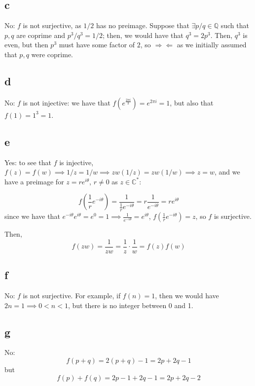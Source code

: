 \documentclass[12pt,letterpaper]{article}
\theoremstyle{definition}
\newcommand{\contra}{\Rightarrow\!\Leftarrow}
\newcommand{\Q}{\mathbb{Q}}
\newcommand{\C}{\mathbb{C}}
\begin{document}
\subsection*{c}

No: \(f\) is not surjective, as \(1/2\) has no preimage. Suppose that \(\exists p/q \in \Q\) such that \(p,q\) are coprime and \(p^{3}/q^{3} = 1 / 2\); then, we would have that \(q^{3} = 2p^{3}\). Then, \(q^{3}\) is even, but then \(p^{3}\) must have some factor of \(2\), so \(\contra\) as we initially assumed that \(p,q\) were coprime.

\subsection*{d}

No: \(f\) is not injective: we have that \(f(e^{\frac{2\pi i}{3}}) = e^{2\pi i} = 1\), but also that \(f(1) = 1^{3} = 1\).

\subsection*{e}

Yes: to see that \(f\) is injective, \(f(z) = f(w) \implies 1/z = 1/w \implies zw(1/z) = zw(1/w) \implies z = w\), and we have a preimage for \(z = re^{i\theta}\), \(r \neq 0\) as \(z \in \C^{*}\):

\[
  f\left(\frac{1}{r}e^{-i\theta}\right) = \frac{1}{\frac{1}{r}e^{-i\theta}} = r\frac{1}{e^{-i\theta}} = re^{i\theta}
\]
since we have that \(e^{-i\theta}e^{i\theta} = e^{0} = 1 \implies \frac{1}{e^{-i\theta}} = e^{i\theta}\), \(f\left(\frac{1}{r}e^{-i\theta}\right) = z\), so \(f\) is surjective.

Then,
\[
  f(zw) = \frac{1}{zw} = \frac{1}{z}\cdot \frac{1}{w} = f(z)f(w)
\]

\subsection*{f}

No: \(f\) is not surjective. For example, if \(f(n) = 1\), then we would have \(2n = 1 \implies 0 < n < 1\), but there is no integer between 0 and 1.

\subsection*{g}

No:
\[
  f(p + q) = 2(p + q) - 1 = 2p + 2q - 1
\]
but
\[
  f(p) + f(q) = 2p - 1 + 2q - 1 = 2p + 2q - 2
\]
\end{document}
